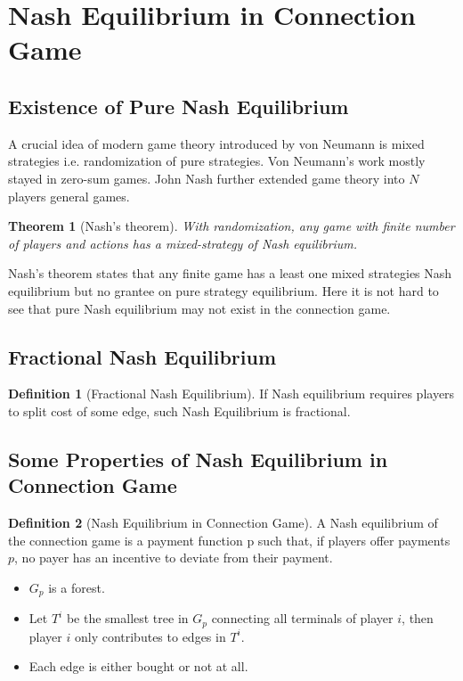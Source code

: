 \documentclass[11pt,psfig,times]{article}
\theoremstyle{theorem}
\newtheorem{theorem}{Theorem}[section]
\theoremstyle{definition}
\newtheorem{definition}{Definition}[section]
\begin{document}
\section{Nash Equilibrium in Connection Game}
\subsection{Existence of Pure Nash Equilibrium}
A crucial idea of modern game theory introduced by von Neumann is mixed strategies i.e. randomization of pure strategies. Von Neumann's work mostly stayed in zero-sum games. John Nash further extended game theory into \(N\) players general games.  
\begin{theorem}[Nash's theorem]
	With randomization, any game with finite number of players and actions has a mixed-strategy of Nash equilibrium.
\end{theorem}
Nash's theorem states that any finite game has a least one mixed strategies Nash equilibrium but no grantee on pure strategy equilibrium. Here it is not hard to see that pure Nash equilibrium may not exist in the connection game. 

\subsection{Fractional Nash Equilibrium}
\begin{definition}[Fractional Nash Equilibrium]If Nash equilibrium requires players to split cost of some edge, such Nash Equilibrium is fractional.	
\end{definition}

\subsection{Some Properties of Nash Equilibrium in Connection Game}
\begin{definition}[Nash Equilibrium in Connection Game]
	A Nash equilibrium of the connection game is a payment function p such that, if players offer payments \(p\), no payer has an incentive to deviate from their payment. 
\end{definition}
\begin{itemize}
	\item \(G_p\) is a forest.
	\item Let \(T^i\) be the smallest tree in \(G_p\) connecting all terminals of player \(i\), then player \(i\) only contributes to edges in \(T^i\).
	\item Each edge is either bought or not at all. 
\end{itemize}
\end{document}
